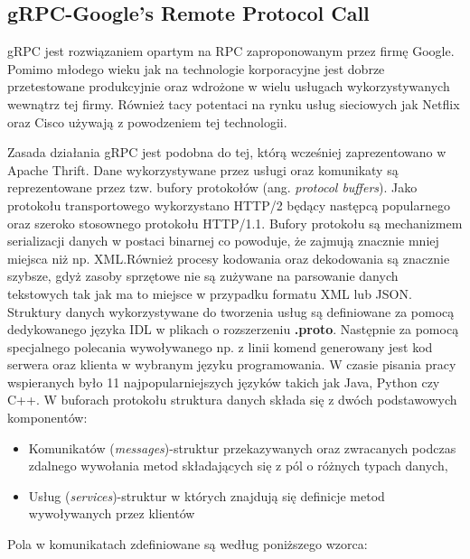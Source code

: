 \subsection{gRPC-Google's Remote Protocol Call}
gRPC jest rozwiązaniem opartym na RPC zaproponowanym przez firmę Google. Pomimo młodego wieku jak na technologie korporacyjne jest dobrze przetestowane produkcyjnie oraz wdrożone w wielu usługach wykorzystywanych wewnątrz tej firmy. Również tacy potentaci na rynku usług sieciowych jak Netflix oraz Cisco używają z powodzeniem tej technologii.
\par Zasada działania gRPC jest podobna do tej, którą wcześniej zaprezentowano w Apache Thrift. Dane wykorzystywane przez usługi oraz komunikaty są reprezentowane przez tzw. bufory protokołów (ang. \textit{protocol buffers}). Jako protokołu transportowego wykorzystano HTTP/2 będący następcą popularnego oraz szeroko stosownego protokołu HTTP/1.1. Bufory protokołu są mechanizmem serializacji danych w postaci binarnej co powoduje, że zajmują znacznie mniej miejsca niż np. XML.\@ Również procesy kodowania oraz dekodowania są znacznie szybsze, gdyż zasoby sprzętowe nie są zużywane na parsowanie danych tekstowych tak jak ma to miejsce w przypadku formatu XML lub JSON. Struktury danych wykorzystywane do tworzenia usług są definiowane za pomocą dedykowanego języka IDL w plikach o rozszerzeniu \textbf{.proto}. Następnie za pomocą specjalnego polecania wywoływanego np. z linii komend generowany jest kod serwera oraz klienta w wybranym języku programowania. W czasie pisania pracy wspieranych było 11 najpopularniejszych języków takich jak Java, Python czy C++. W buforach protokołu struktura danych składa się z dwóch podstawowych komponentów: 
\begin{itemize}
  \item Komunikatów (\textit{messages})-struktur przekazywanych oraz zwracanych podczas zdalnego wywołania metod składających się z pól o różnych typach danych,
  \item Usług (\textit{services})-struktur w których znajdują się definicje metod wywoływanych przez klientów
\end{itemize}
\noindent
Pola w komunikatach zdefiniowane są według poniższego wzorca:

